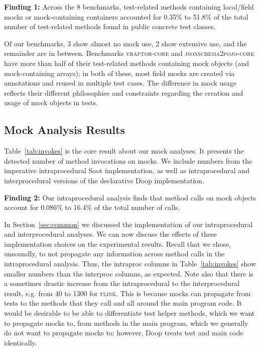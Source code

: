 \begin{mdframed}[
	leftmargin=\parindent,
	rightmargin=\parindent,
	skipabove=\topsep,
	skipbelow=\topsep
	]
	{\bf Finding 1:} Across the 8 benchmarks, test-related methods containing local/field mocks or mock-containing containers accounted for 0.35\% to 51.8\% of the total number of test-related methods found in public concrete test classes.
\end{mdframed}

Of our benchmarks, 3 show almost no mock use, 2 show extensive use, and the remainder are in between. Benchmarks \textsc{vraptor-core} and \textsc{jsonschema2pojo-core} have more than half of their test-related methods containing mock objects (and mock-containing arrays); in both of these, most field mocks are created via annotations and reused in multiple test cases. The difference in mock usage reflects their different philosophies and constraints regarding the creation and usage of mock objects in tests.

\subsection{Mock Analysis Results}
Table~\ref{tab:invokes} is the core result about our mock analyses. It presents the detected number of method invocations on mocks. We include numbers from the imperative intraprocedural Soot implementation, as well as intraprocedural and interprocedural versions of the declarative Doop implementation.

\begin{mdframed}[
	leftmargin=\parindent,
	rightmargin=\parindent,
	skipabove=\topsep,
	skipbelow=\topsep
	]
	{\bf Finding 2:} Our intraprocedural analysis finds that method calls on mock objects account for 0.086\% to 16.4\% of the total number of calls. 
\end{mdframed}


In Section~\ref{sec:common} we discussed the implementation of our intraprocedural and interprocedural analyses. We can now discuss the effects of these implementation choices on the experimental results. Recall that we chose, unsoundly, to not propagate any information across method calls in the intraprocedural analysis. Thus, the intraproc columns in Table~\ref{tab:invokes} show smaller numbers than the interproc columns, as expected. Note also that there is a sometimes drastic increase from the intraprocedural to the interprocedural result, e.g. from 40 to 1300 for \textsc{flink}. This is because mocks can propagate from tests to the methods that they call and all around the main program code. It would be desirable to be able to differentiate test helper methods, which we want to propagate mocks to, from methods in the main program, which we generally do not want to propagate mocks to; however, Doop treats test and main code identically.

